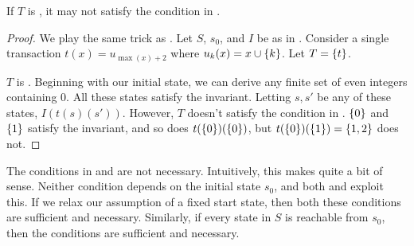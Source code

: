 \begin{claim}
  If $T$ is \Iconfluent, it may not satisfy the condition in
  .
\end{claim}
\begin{proof}
  We play the same trick as . Let $S$, $s_0$,
  and $I$ be as in . Consider a single
  transaction $t(x) = u_{\max(x) + 2}$ where $u_k(x) = x \cup \{k\}$. Let $T
  = \{t\}$.

  $T$ is \Iconfluent{}. Beginning with our initial state, we can derive any
  finite set of even integers containing $0$. All these states satisfy the
  invariant. Letting $s, s'$ be any of these states, $I(t(s)(s'))$.
  However, $T$ doesn't satisfy the condition in .
  $\{0\}$ and $\{1\}$ satisfy the invariant, and so does
  $t(\{0\})(\{0\})$, but $t(\{0\})(\{1\}) = \{1, 2\}$ does not.
\end{proof}


The conditions in  and 
are not necessary. Intuitively, this makes quite a bit of sense. Neither
condition depends on the initial state $s_0$, and both
 and  exploit this.
If we relax our assumption of a fixed start state, then both these conditions
are sufficient and necessary. Similarly, if every state in $S$ is reachable
from $s_0$, then the conditions are sufficient and necessary.


